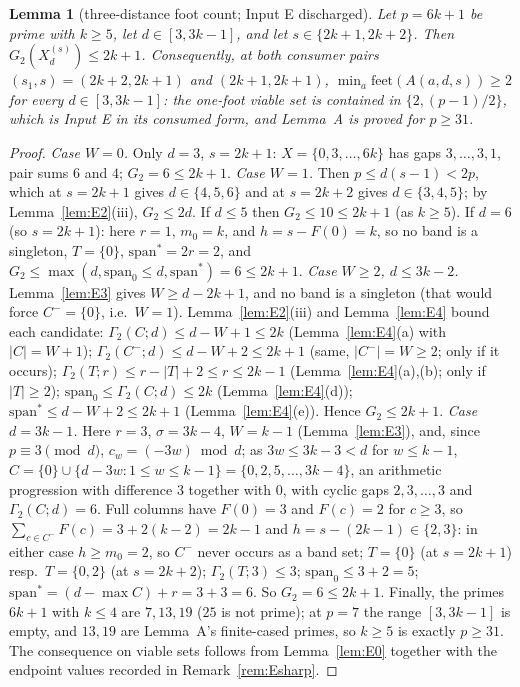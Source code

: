 \documentclass[11pt,a4paper]{article}
\numberwithin{equation}{section}
\theoremstyle{plain}
\theoremstyle{plain}
\newtheorem{lemma}[theorem]{Lemma}
\theoremstyle{definition}
\theoremstyle{remark}
\begin{document}
\begin{lemma}[three-distance foot count; Input E discharged]\label{lem:E}
Let $p=6k+1$ be prime with $k\ge5$, let $d\in[3,3k-1]$, and let
$s\in\{2k{+}1,2k{+}2\}$. Then $G_2(X^{(s)}_d)\le2k+1$. Consequently, at
both consumer pairs $(s_1,s)=(2k{+}2,2k{+}1)$ and $(2k{+}1,2k{+}1)$,
$\min_a\mathrm{feet}(A(a,d,s))\ge2$ for every $d\in[3,3k-1]$: the
one-foot viable set is contained in $\{2,(p-1)/2\}$, which is Input E
in its consumed form, and Lemma~A is proved for $p\ge31$.
\end{lemma}

\begin{proof}
\emph{Case $W=0$.} Only $d=3$, $s=2k{+}1$: $X=\{0,3,\dots,6k\}$ has
gaps $3,\dots,3,1$, pair sums $6$ and $4$; $G_2=6\le2k+1$.
\emph{Case $W=1$.} Then $p\le d(s-1)<2p$, which at $s=2k{+}1$ gives
$d\in\{4,5,6\}$ and at $s=2k{+}2$ gives $d\in\{3,4,5\}$; by
Lemma~\ref{lem:E2}(iii), $G_2\le2d$. If $d\le5$ then
$G_2\le10\le2k+1$ (as $k\ge5$). If $d=6$ (so $s=2k{+}1$): here $r=1$,
$m_0=k$, and $h=s-F(0)=k$, so no band is a singleton, $T=\{0\}$,
$\mathrm{span}^\ast=2r=2$, and $G_2\le\max(d,\mathrm{span}_0\le d,
\mathrm{span}^\ast)=6\le2k+1$.
\emph{Case $W\ge2$, $d\le3k-2$.} Lemma~\ref{lem:E3} gives
$W\ge d-2k+1$, and no band is a singleton (that would force
$C^-=\{0\}$, i.e.\ $W=1$). Lemma~\ref{lem:E2}(iii) and
Lemma~\ref{lem:E4} bound each candidate:
$\Gamma_2(C;d)\le d-W+1\le2k$ (Lemma~\ref{lem:E4}(a) with $|C|=W+1$);
$\Gamma_2(C^-;d)\le d-W+2\le2k+1$ (same, $|C^-|=W\ge2$; only if it
occurs); $\Gamma_2(T;r)\le r-|T|+2\le r\le2k-1$
(Lemma~\ref{lem:E4}(a),(b); only if $|T|\ge2$);
$\mathrm{span}_0\le\Gamma_2(C;d)\le2k$ (Lemma~\ref{lem:E4}(d));
$\mathrm{span}^\ast\le d-W+2\le2k+1$ (Lemma~\ref{lem:E4}(e)). Hence
$G_2\le2k+1$.
\emph{Case $d=3k-1$.} Here $r=3$, $\sigma=3k-4$, $W=k-1$
(Lemma~\ref{lem:E3}), and, since $p\equiv3\pmod d$,
$c_w=(-3w)\bmod d$; as $3w\le3k-3<d$ for $w\le k-1$,
$C=\{0\}\cup\{d-3w:1\le w\le k-1\}=\{0,2,5,\dots,3k-4\}$, an
arithmetic progression with difference $3$ together with $0$, with
cyclic gaps $2,3,\dots,3$ and $\Gamma_2(C;d)=6$. Full columns have
$F(0)=3$ and $F(c)=2$ for $c\ge3$, so
$\sum_{c\in C^-}F(c)=3+2(k-2)=2k-1$ and $h=s-(2k-1)\in\{2,3\}$: in
either case $h\ge m_0=2$, so $C^-$ never occurs as a band set;
$T=\{0\}$ (at $s=2k{+}1$) resp.\ $T=\{0,2\}$ (at $s=2k{+}2$);
$\Gamma_2(T;3)\le3$; $\mathrm{span}_0\le3+2=5$;
$\mathrm{span}^\ast=(d-\max C)+r=3+3=6$. So $G_2=6\le2k+1$.
Finally, the primes $6k+1$ with $k\le4$ are $7,13,19$ ($25$ is not
prime); at $p=7$ the range $[3,3k-1]$ is empty, and $13,19$ are
Lemma~A's finite-cased primes, so $k\ge5$ is exactly $p\ge31$. The
consequence on viable sets follows from Lemma~\ref{lem:E0} together
with the endpoint values recorded in Remark~\ref{rem:Esharp}.
\end{proof}
\end{document}
